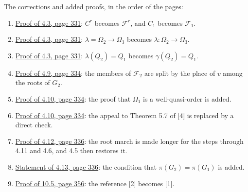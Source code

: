 The corrections and added proofs, in the order of the pages:
\begin{enumerate}\setlength{\itemsep}{1pt}
\item {}\hyperref[fix:4.3-Fr]{Proof of 4.3, page 331}: $C^r$ becomes $\mathcal{F}^r$, and $C_1$
becomes $\mathcal{F}_1$.
\item {}\hyperref[fix:4.3-lambda]{Proof of 4.3, page 331}: $\lambda = \Omega_2 \to \Omega_3$
becomes $\lambda \colon \Omega_2 \to \Omega_3$.
\item {}\hyperref[fix:4.3-gamma]{Proof of 4.3, page 331}: $\lambda(Q_2) = Q_1$ becomes
$\gamma(Q_2) = Q_1$.
\item {}\hyperref[fix:4.9-proof]{Proof of 4.9, page 334}: the members of $\mathcal{F}_2$ are split
by the place of $v$ among the roots of $G_2$.
\item {}\hyperref[fix:4.10-omega-proof-added]{Proof of 4.10, page 334}: the proof that $\Omega_1$ is
a well-quasi-order is added.
\item {}\hyperref[fix:4.10-proof]{Proof of 4.10, page 334}: the appeal to Theorem 5.7 of [4] is
replaced by a direct check.
\item {}\hyperref[fix:4.12-proof]{Proof of 4.12, page 336}: the root march is made longer for the
steps through 4.11 and 4.6, and 4.5 then restores it.
\item {}\hyperref[fix:4.13]{Statement of 4.13, page 336}: the condition that $\pi(G_2) = \pi(G_1)$ is
added.
\item {}\hyperref[fix:10.5-proof]{Proof of 10.5, page 356}: the reference [2] becomes [1].
\end{enumerate}
